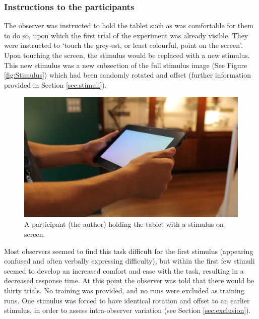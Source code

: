 \subsubsection{Instructions to the participants}

The observer was instructed to hold the tablet such as was comfortable for them to do so, upon which the first trial of the experiment was already visible. They were instructed to `touch the grey-est, or least colourful, point on the screen'. Upon touching the screen, the stimulus would be replaced with a new stimulus. This new stimulus was a new subsection of the full stimulus image (See Figure \ref{fig:Stimulus}) which had been randomly rotated and offset (further information provided in Section \ref{sec:stimuli}).

\begin{figure}[hbtp]
\includegraphics[max width=\textwidth]{figs/tablet/MVI_3213-1.jpg} %
\caption{A participant (the author) holding the tablet with a stimulus on screen.}
\label{fig:grant_demo}
\end{figure}

Most observers seemed to find this task difficult for the first stimulus (appearing confused and often verbally expressing difficulty), but within the first few stimuli seemed to develop an increased comfort and ease with the task, resulting in a decreased response time. %
At this point the observer was told that there would be thirty trials. No training was provided, and no runs were excluded as training runs. One stimulus was forced to have identical rotation and offset to an earlier stimulus, in order to assess intra-observer variation (see Section \ref{sec:exclusion}).

